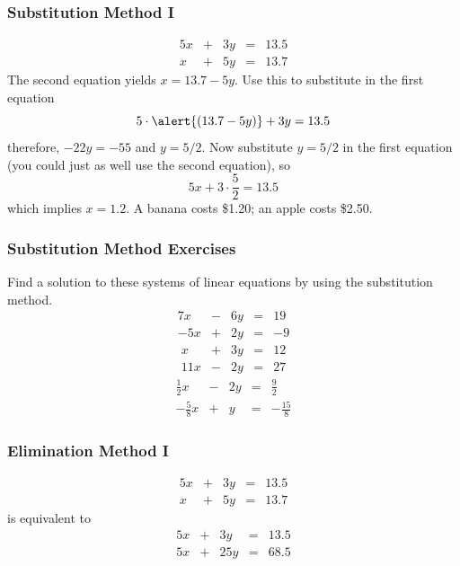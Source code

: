 \documentclass[xcolor=dvipsnames]{beamer}
\begin{document}
\begin{frame}
  \frametitle{Substitution Method I}
  \begin{equation}
    \label{eq:jichoora}
    \begin{array}{rcrcl}
      5x&+&3y&=&13.5 \\
      x&+&5y&=&13.7
    \end{array}
  \end{equation}
The second equation yields $x=13.7-5y$. Use this to substitute in the
first equation
  \begin{equation}
    \label{eq:iewoobih}
5\cdot\alert{(13.7-5y)}+3y=13.5
  \end{equation}
therefore, $-22y=-55$ and $y=5/2$. Now substitute $y=5/2$ in the first
equation (you could just as well use the second equation), so
\begin{equation}
  \label{eq:phaiyahj}
  5x+3\cdot\frac{5}{2}=13.5
\end{equation}
which implies $x=1.2$. A banana costs \$1.20; an apple costs \$2.50.
\end{frame}

\begin{frame}
  \frametitle{Substitution Method Exercises}
Find a solution to these systems of linear equations by using the
substitution method.
  \begin{equation}
    \label{eq:waduifee}
    \begin{array}{rcrcl}
      7x&-&6y&=&19 \\
      -5x&+&2y&=&-9
    \end{array}
  \end{equation}
  \begin{equation}
    \label{eq:weiyushe}
    \begin{array}{rcrcl}
      x&+&3y&=&12 \\
      11x&-&2y&=&27
    \end{array}
  \end{equation}
  \begin{equation}
    \label{eq:jiadaush}
    \begin{array}{rcrcl}
      \frac{1}{2}x&-&2y&=&\frac{9}{2} \\
      -\frac{5}{8}x&+&y&=&-\frac{15}{8}
    \end{array}
  \end{equation}
\end{frame}

\begin{frame}
  \frametitle{Elimination Method I}
  \begin{equation}
    \label{eq:ohneirae}
    \begin{array}{rcrcl}
      5x&+&3y&=&13.5 \\
      x&+&5y&=&13.7
    \end{array}
  \end{equation}
is equivalent to
  \begin{equation}
    \label{eq:wahheedo}
    \begin{array}{rcrcl}
      5x&+&3y&=&13.5 \\
      5x&+&25y&=&68.5
    \end{array}
  \end{equation}
\end{frame}
\end{document}
